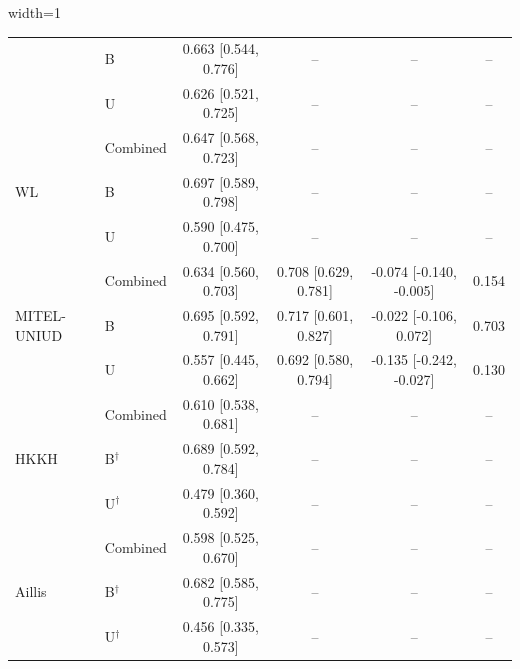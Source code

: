 \begin{table}[H]
\begin{adjustbox}{width=1\textwidth}
\begin{tabular}{llcccc}
   & B & 0.663 [0.544, 0.776] & -- & -- & -- \\
   & U & 0.626 [0.521, 0.725] & -- & -- & -- \\
  \hline
  \multirow{3}{*}{WL} & Combined & 0.647 [0.568, 0.723] & -- & -- & -- \\
   & B & 0.697 [0.589, 0.798] & -- & -- & -- \\
   & U & 0.590 [0.475, 0.700] & -- & -- & -- \\
  \hline
  \multirow{3}{*}{MITEL-UNIUD} & Combined & 0.634 [0.560, 0.703] & 0.708 [0.629, 0.781] & -0.074 [-0.140, -0.005] & 0.154 \\
   & B & 0.695 [0.592, 0.791] & 0.717 [0.601, 0.827] & -0.022 [-0.106, 0.072] & 0.703 \\
   & U & 0.557 [0.445, 0.662] & 0.692 [0.580, 0.794] & -0.135 [-0.242, -0.027] & 0.130 \\
  \hline
  \multirow{3}{*}{HKKH} & Combined & 0.610 [0.538, 0.681] & -- & -- & -- \\
   & B$^{\dagger}$ & 0.689 [0.592, 0.784] & -- & -- & -- \\
   & U$^{\dagger}$ & 0.479 [0.360, 0.592] & -- & -- & -- \\
  \hline
  \multirow{3}{*}{Aillis} & Combined & 0.598 [0.525, 0.670] & -- & -- & -- \\
   & B$^{\dagger}$ & 0.682 [0.585, 0.775] & -- & -- & -- \\
   & U$^{\dagger}$ & 0.456 [0.335, 0.573] & -- & -- & -- \\
  \hline
  \end{tabular}
  \end{adjustbox}
  \label{tab:task2_robustness_nif_unified_f1}
\end{table}
